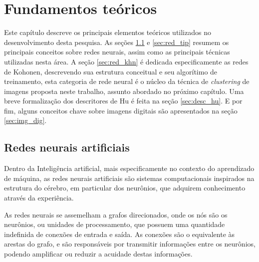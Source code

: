 \chapter{Fundamentos teóricos}

Este capítulo descreve os principais elementos teóricos utilizados no
desenvolvimento desta pesquisa. As seções \ref{sec:red_neu} e \ref{sec:red_tip}
resumem os principais conceitos sobre redes neurais, assim como as principais
técnicas utilizadas nesta área. A seção \ref{sec:red_khn} é dedicada
especificamente as redes de Kohonen, descrevendo sua estrutura conceitual e seu
algorítimo de treinamento, esta categoria de rede neural é o núcleo da técnica
de \textit{clustering} de imagens proposta neste trabalho, assunto abordado no
próximo capítulo. Uma breve formalização dos descritores de Hu é feita na seção
\ref{sec:desc_hu}. E por fim, alguns conceitos chave sobre imagens digitais são
apresentados na seção \ref{sec:img_dig}.

\section{Redes neurais artificiais}\label{sec:red_neu}

Dentro da Inteligência artificial, mais especificamente no contexto do
aprendizado de máquina, as redes neurais artificiais são sistemas computacionais
inspirados na estrutura do cérebro, em particular dos neurônios, que adquirem
conhecimento através da experiência.

As redes neurais se assemelham a grafos direcionados, onde os nós são os
neurônios, ou unidades de processamento, que possuem uma quantidade indefinida
de conexões de entrada e saída. As conexões são o equivalente às arestas do
grafo, e são responsáveis por transmitir informações entre os neurônios, podendo
amplificar ou reduzir a acuidade destas informações.


